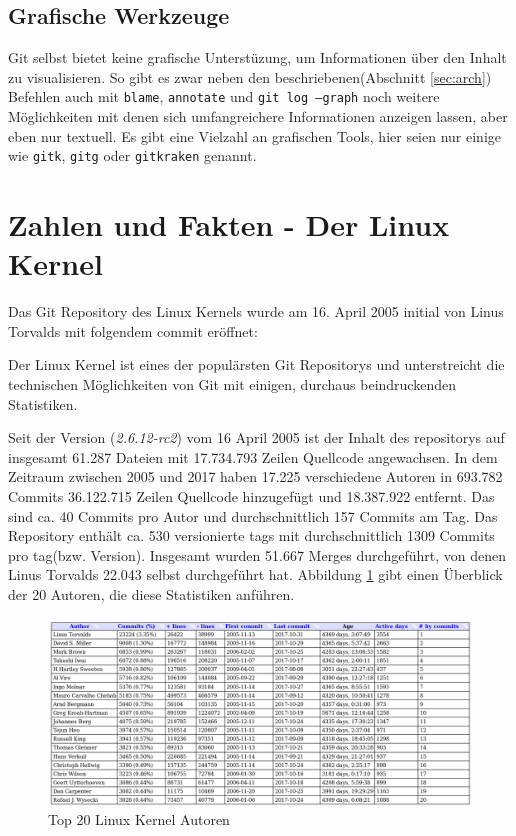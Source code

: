 \subsection{Grafische Werkzeuge}
Git selbst bietet keine grafische Unterstüzung, um Informationen über den
Inhalt zu visualisieren. So gibt es zwar neben den beschriebenen(Abschnitt
\ref{sec:arch}) Befehlen auch mit \texttt{blame}, \texttt{annotate} und
\texttt{git log --graph} noch weitere Möglichkeiten mit denen sich
umfangreichere Informationen anzeigen lassen, aber eben nur
textuell\cite[S.~302]{gitwf}. Es gibt eine Vielzahl an grafischen Tools, hier
seien nur einige wie \texttt{gitk}, \texttt{gitg} oder \texttt{gitkraken}
genannt.

\section{Zahlen und Fakten - Der Linux Kernel}\label{sec:kernel}
Das Git Repository des Linux Kernels wurde am 16. April 2005 initial von Linus
Torvalds mit folgendem \gls{commit}\cite{link:linuxgit} eröffnet:



Der Linux Kernel ist eines der populärsten Git Repositorys und unterstreicht
die technischen Möglichkeiten von Git mit einigen, durchaus beindruckenden
Statistiken.

Seit der Version (\textit{2.6.12-rc2}) vom 16 April 2005 ist der Inhalt des
\glspl{repository} auf insgesamt 61.287 Dateien mit 17.734.793 Zeilen Quellcode
angewachsen. In dem Zeitraum zwischen 2005 und 2017 haben 17.225 verschiedene
Autoren in 693.782 Commits 36.122.715 Zeilen Quellcode hinzugefügt und
18.387.922 entfernt. Das sind ca. 40 Commits pro Autor und durchschnittlich
157 Commits am Tag. Das Repository enthält ca. 530 versionierte \glspl{tag}
mit durchschnittlich 1309 Commits pro \gls{tag}(bzw. Version). Insgesamt wurden
51.667 Merges durchgeführt, von denen Linus Torvalds 22.043 selbst durchgeführt
hat. Abbildung \ref{top20} gibt einen Überblick der 20 Autoren, die diese
Statistiken anführen.

\begin{figure}
	\centering
  \includegraphics[scale=0.40]{images/top_20_of_linux_authors.png}
	\caption{Top 20 Linux Kernel Autoren}
	\label{top20}
\end{figure}

